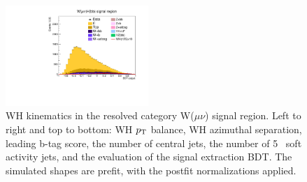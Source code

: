 \begin{figure}[tbp]
\begin{center}
    \includegraphics[width=0.48\textwidth]{figures/wlnhbb2016/resolved/WmnWHSR_bdtValue.pdf}
    \caption{WH kinematics in the resolved category W($\mu\nu$) signal region.
    Left to right and top to bottom: WH $p_{\mathrm{T}}$ balance, WH azimuthal separation, leading b-tag score, the number of central jets,
    the number of 5 \GeV\ soft activity jets, and the evaluation of the signal extraction BDT.
    The simulated shapes are prefit, with the postfit normalizations applied.}
    \label{fig:res_WmnSR_WH}
  \end{center}
\end{figure}
\clearpage

